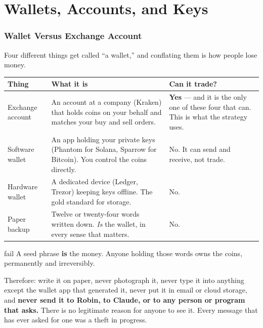 \documentclass[11pt,a4paper]{article}
\begin{document}
\part{Wallets, Accounts, and Keys}

\section{Wallet Versus Exchange Account}
\label{sec:wallets}

Four different things get called ``a wallet,'' and conflating them is
how people lose money.

\vspace{0.5em}
\begin{tabular}{@{}p{3.0cm}p{5.2cm}p{5.4cm}@{}}
    \toprule
    \textbf{Thing} & \textbf{What it is} & \textbf{Can it trade?} \\
    \midrule
    Exchange account &
    An account at a company (Kraken) that holds coins on your behalf and
    matches your buy and sell orders. &
    \textbf{Yes} --- and it is the only one of these four that can.
    This is what the strategy uses. \\[0.4em]
    Software wallet &
    An app holding your private keys (Phantom for Solana, Sparrow for
    Bitcoin). You control the coins directly. &
    No. It can send and receive, not trade. \\[0.4em]
    Hardware wallet &
    A dedicated device (Ledger, Trezor) keeping keys offline. The
    gold standard for storage. &
    No. \\[0.4em]
    Paper backup &
    Twelve or twenty-four words written down. \emph{Is} the wallet, in
    every sense that matters. &
    No. \\
    \bottomrule
\end{tabular}

\vspace{0.5em}

\begin{resultbox}{fail}
A seed phrase \textbf{is} the money. Anyone holding those words owns
the coins, permanently and irreversibly.

\vspace{0.4em}
Therefore: write it on paper, never photograph it, never type it into
anything except the wallet app that generated it, never put it in
email or cloud storage, and \textbf{never send it to Robin, to Claude,
or to any person or program that asks.} There is no legitimate reason
for anyone to see it. Every message that has ever asked for one was a
theft in progress.
\end{resultbox}
\end{document}
